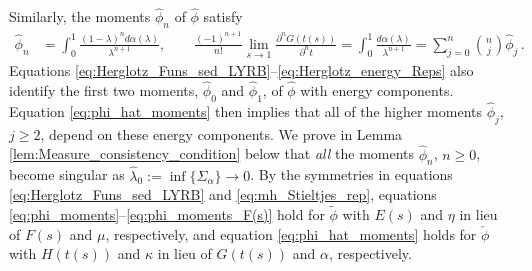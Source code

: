 \documentclass[english,12pt,jmp,graphicx]{revtex4-1}
\newcommand{\ph}{\hat{\phi}}
\begin{document}
Similarly, the moments $\ph_n$ of $\ph$
satisfy  
%
\begin{align}\label{eq:phi_hat_moments}
  \ph_n%
      &=\int_0^1\frac{(1-\lambda)^nd\alpha(\lambda)}{\lambda^{n+1}}, \qquad
      \frac{(-1)^{n+1}}{n!}\lim_{s\to1}\frac{\partial^nG(t(s))}{\partial^nt}
         =\int_0^1\frac{d\alpha(\lambda)}{\lambda^{n+1}}
          =\sum_{j=0}^n{n \choose j} \ph_j\,.
\end{align}
%
Equations
\eqref{eq:Herglotz_Funs_sed_LYRB}--\eqref{eq:Herglotz_energy_Reps}
also identify the first two moments, $\ph_0$ and $\ph_1$, of
$\ph$ with energy components. Equation \eqref{eq:phi_hat_moments} then
implies that all of the higher moments $\ph_j$, $j\geq2$, depend on these
energy components. We prove in Lemma
\ref{lem:Measure_consistency_condition} below that \emph{all} the
moments $\ph_n$, $n\geq0$, become singular as
$\hat{\lambda}_0:=\inf\{\Sigma_\alpha\}\to0$. By the symmetries in equations 
\eqref{eq:Herglotz_Funs_sed_LYRB} and \eqref{eq:mh_Stieltjes_rep},
equations \eqref{eq:phi_moments}--\eqref{eq:phi_moments_F(s)} hold for
$\tilde{\phi}$ with $E(s)$ and $\eta$ in lieu of $F(s)$ and $\mu$,
respectively, and equation \eqref{eq:phi_hat_moments} holds for
$\check{\phi}$ with $H(t(s))$ and $\kappa$ in lieu of $G(t(s))$ and $\alpha$,
respectively.
\end{document}
